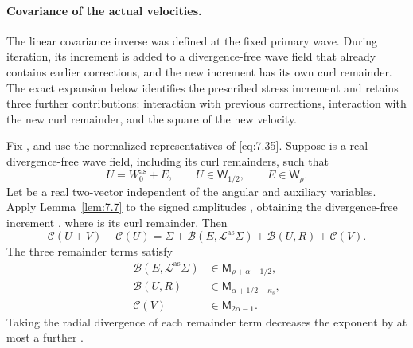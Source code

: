 \paragraph{Covariance of the actual velocities.}
The linear covariance inverse was defined at the fixed
primary wave. During iteration, its increment is added to a divergence-free wave field that
already contains earlier corrections, and the new increment has its own curl remainder. The
exact expansion below identifies the prescribed stress increment and retains three further
contributions: interaction with previous corrections, interaction with the new curl remainder,
and the square of the new velocity.

\begin{corollary}\label{cor:7.8}
Fix , and use the normalized representatives of \eqref{eq:7.35}. Suppose
 is a real
divergence-free wave field, including its curl remainders, such that
\[
  U=W_0^{\mathrm{as}}+E,
  \qquad U\in \mathsf W_{1/2},
  \qquad E\in \mathsf W_\rho.
\]
Let  be a real two-vector independent of the angular and auxiliary variables. Apply
Lemma~\ref{lem:7.7} to the signed amplitudes
, obtaining the divergence-free increment
,
where  is its curl remainder. Then
\begin{equation}
  \mathcal C(U+V)-\mathcal C(U)
  =\Sigma+\mathcal B(E,\mathcal L^{\mathrm{as}}\Sigma)
   +\mathcal B(U,R)+\mathcal C(V).
\tag{7.41}\label{eq:7.41}
\end{equation}
The three remainder terms satisfy
\begin{equation}
\begin{aligned}
  \mathcal B(E,\mathcal L^{\mathrm{as}}\Sigma)&\in \mathsf M_{\rho+\alpha-1/2},\\
  \mathcal B(U,R)&\in \mathsf M_{\alpha+1/2-\kappa_s},\\
  \mathcal C(V)&\in \mathsf M_{2\alpha-1}.
\end{aligned}
\tag{7.42}\label{eq:7.42}
\end{equation}
Taking the radial divergence of each remainder term decreases the
 exponent by at most a further
.
\end{corollary}

